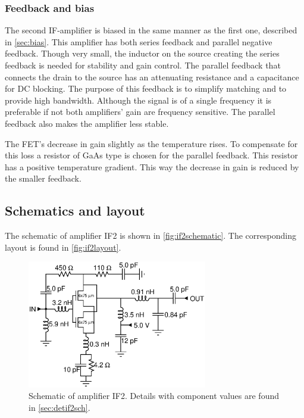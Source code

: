 			\subsubsection{Feedback and bias}
				The second IF-amplifier is biased in the same manner as the first one, described in \autoref{sec:bias}. This amplifier has both series feedback and parallel negative feedback. Though very small, the inductor on the source creating the series feedback is needed for stability and gain control. The parallel feedback that connects the drain to the source has an attenuating resistance and a capacitance for DC blocking. The purpose of this feedback is to simplify matching and to provide high bandwidth. Although the signal is of a single frequency it is preferable if not both amplifiers' gain are frequency sensitive. The parallel feedback also makes the amplifier less stable.

				The FET's decrease in gain slightly as the temperature rises. To compensate for this loss a resistor of GaAs type is chosen for the parallel feedback. This resistor has a positive temperature gradient. This way the decrease in gain is reduced by the smaller feedback.

		\subsection{Schematics and layout}
			The schematic of amplifier IF2 is shown in \autoref{fig:if2schematic}. The corresponding layout is found in \autoref{fig:if2layout}.

			\begin{figure}[hbt!]
				\centering
				\includegraphics[width=0.7\textwidth]{fig/amplifiers/if2/sch_if2}
				\caption[Amplifier IF2 schematic.]{Schematic of amplifier IF2. Details with component values are found in \autoref{sec:detif2sch}.}\label{fig:if2schematic}
			\end{figure}

